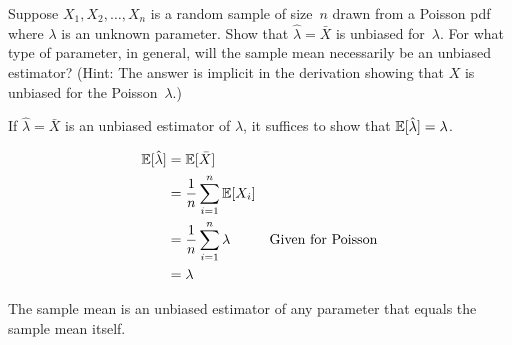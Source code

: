 \begin{problem}
   Suppose $X_1,X_2,\ldots,X_n$ is a random sample of size~$n$ drawn from a Poisson pdf where $\lambda$ is an unknown parameter. Show that ${\hat{\lambda} = \bar{X}}$ is unbiased for~$\lambda$. For what type of parameter, in general, will the sample mean necessarily be an unbiased estimator? (Hint: The answer is implicit in the derivation showing that $X$ is unbiased for the Poisson~$\lambda$.)
\end{problem}

If ${\hat{\lambda} = \bar{X}}$ is an unbiased estimator of $\lambda$, it suffices to show that ${\mathbb{E}\lbrack\hat{\lambda}\rbrack = \lambda}$.

\begin{align*}
  \mathbb{E}\lbrack\hat{\lambda}\rbrack &= \mathbb{E}\lbrack\bar{X}\rbrack \\
                         &= \frac{1}{n} \sum_{i=1}^{n} \mathbb{E}\lbrack X_i\rbrack \\
                         &= \frac{1}{n} \sum_{i=1}^{n} \lambda & \text{Given for Poisson} \\
                         &= \lambda
\end{align*}

The sample mean is an unbiased estimator of any parameter that equals the sample mean itself.
